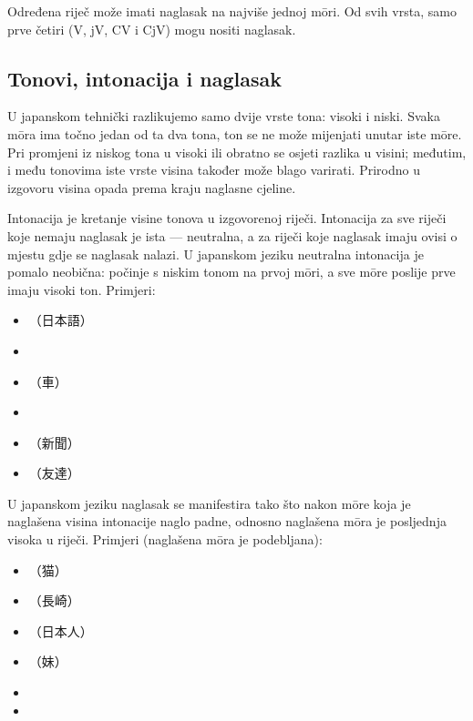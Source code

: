Određena riječ može imati naglasak na najviše jednoj m\=ori.
Od svih vrsta, samo prve četiri (V, jV, CV i CjV) mogu nositi naglasak.

\subsection{Tonovi, intonacija i naglasak}
U japanskom tehnički razlikujemo samo dvije vrste tona: visoki i niski.
Svaka m\=ora ima točno jedan od ta dva tona, ton se ne može mijenjati unutar iste m\=ore.
Pri promjeni iz niskog tona u visoki ili obratno se osjeti razlika u visini; međutim, i među tonovima iste vrste visina također može blago varirati.
Prirodno u izgovoru visina opada prema kraju naglasne cjeline.

Intonacija je kretanje visine tonova u izgovorenoj riječi.
Intonacija za sve riječi koje nemaju naglasak je ista --- neutralna, a za riječi koje naglasak imaju ovisi o mjestu gdje se naglasak nalazi.
U japanskom jeziku neutralna intonacija je pomalo neobična: počinje s niskim tonom na prvoj m\=ori, a sve m\=ore poslije prve imaju visoki ton.
Primjeri:
\begin{multicols}{3}
	\begin{itemize}
		\item {}（日本語）
		\item {}
		\item {}（車）
		\item {}
		\item {}（新聞）
		\item {}（友達）
	\end{itemize}
\end{multicols}

U japanskom jeziku naglasak se manifestira tako što nakon m\=ore koja je naglašena visina intonacije naglo padne, odnosno naglašena m\=ora je posljednja visoka u riječi.
Primjeri (naglašena m\=ora je podebljana):
\begin{multicols}{3}
	\begin{itemize}
		\item {}（猫）
		\item {}（長崎）
		\item {}（日本人）
		\item {}（妹）
		\item {}
		\item {}
	\end{itemize}
\end{multicols}


